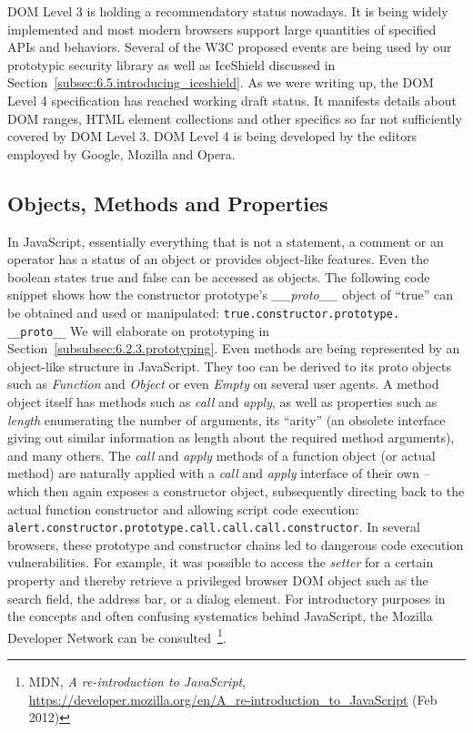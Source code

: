      DOM Level 3 is holding a recommendatory status nowadays. It is being widely implemented and most modern browsers support large quantities of specified APIs and behaviors. Several of the W3C proposed events are being used by our prototypic security library as well as IceShield discussed in Section~\ref{subsec:6.5.introducing_iceshield}. 
     As we were writing up, the DOM Level 4 specification has reached working draft status. It manifests details about DOM ranges, HTML element collections and other specifics so far not sufficiently covered by DOM Level 3. DOM Level 4 is being developed by the editors employed by Google, Mozilla and Opera.

    \subsection{Objects, Methods and Properties}
    \label{subsubsec:6.2.2.objects_methods_and_properties}
    
    In JavaScript, essentially everything that is not a statement, a comment or an operator has a status of an object or provides object-like features. Even the boolean states true and false can be accessed as objects. The following code snippet shows how the constructor prototype's \textit{\_\_proto\_\_} object of ``true'' can be obtained and used or manipulated:  \texttt{true.constructor.prototype.\\
\_\_proto\_\_} We will elaborate on prototyping in Section~\ref{subsubsec:6.2.3.prototyping}. Even methods are being represented by an object-like structure in JavaScript. They too can be derived to its proto objects such as \textit{Function} and \textit{Object} or even \textit{Empty} on several user agents. A method object itself has methods such as \textit{call} and \textit{apply}, as well as properties such as \textit{length} enumerating the number of arguments, its ``arity'' (an obsolete interface giving out similar information as length about the required method arguments), and many others. The \textit{call} and \textit{apply} methods of a function object (or actual method) are naturally applied with a \textit{call} and \textit{apply} interface of their own -- which then again exposes a constructor object, subsequently directing back to the actual function constructor and allowing script code execution: \texttt{alert.constructor.prototype.call.call.call.constructor}. In several browsers, these prototype and constructor chains led to dangerous code execution vulnerabilities. For example, it was possible to access the \textit{setter} for a certain property and thereby retrieve a privileged browser DOM object such as the search field, the address bar, or a dialog element. For introductory purposes in the concepts and often confusing systematics behind JavaScript, the Mozilla Developer Network can be consulted~\footnote{MDN, \textit{A re-introduction to JavaScript}, \url{https://developer.mozilla.org/en/A_re-introduction_to_JavaScript} (Feb 2012)}.\\

